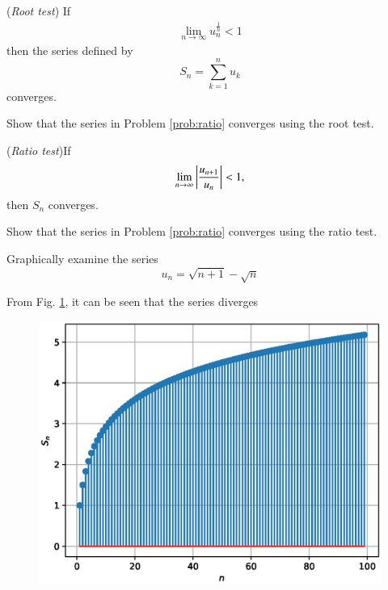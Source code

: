 \documentclass[journal,12pt,twocolumn]{IEEEtran}
\begin{document}
%
\begin{proposition}
\label{prop:root_test}
%
({\em Root test}) If
\begin{align}
\lim_{n\rightarrow \infty}u_n^{\frac{1}{n}} < 1
\end{align}
%
then the series defined by
\begin{equation}
S_n = \sum_{k=1}^{n}u_k
\end{equation}
converges.
\end{proposition}
\begin{problem}
Show that the series in Problem \ref{prob:ratio} converges using the root test.
\end{problem}
\begin{proposition}
\label{prop:ratio}
({\em Ratio test})If 
\begin{align}
\lim_{n\rightarrow \infty}\left\vert\frac{u_{n+1}}{u_n}\right\vert< 1,
\end{align}
then $S_n$ converges.
\end{proposition}
\begin{problem}
Show that the series in Problem \ref{prob:ratio} converges using the ratio test.
\end{problem}
%
\begin{problem}
Graphically examine the series 
\begin{equation}
u_{n}=\sqrt{n+1}-\sqrt{n}
\end{equation}

\end{problem}
\solution From Fig. \ref{fig:3}, it can be seen that the series diverges
%

%
\begin{figure}[!ht]
\begin{center}
\includegraphics[width=\columnwidth]{./figs/2.eps}
\end{center}
\label{fig:3}	
\end{figure}
\end{document}
